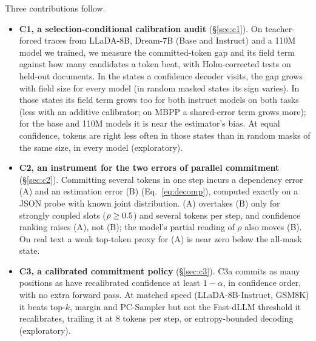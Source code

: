 Three contributions follow.
\begin{itemize}
\item \textbf{C1, a selection-conditional calibration audit} (\S\ref{sec:c1}). On teacher-forced
  traces from LLaDA-8B, Dream-7B (Base and Instruct) and a 110M model we trained, we measure
  the committed-token gap and its field term against how many candidates a token beat, with
  Holm-corrected tests on held-out documents.
  In the states a confidence decoder visits, the gap grows with field size for every model (in
  random masked states its sign varies). In those states its field term grows too for both instruct models on
  both tasks (less with an additive calibrator; on MBPP a shared-error term grows more); for the
  base and 110M models it is near the estimator's bias.
  At equal confidence, tokens are right less often in those states than in random masks of the
  same size, in every model (exploratory).
\item \textbf{C2, an instrument for the two errors of parallel commitment}
  (\S\ref{sec:c2}). Committing several tokens in one step incurs a dependency error (A) and an
  estimation error (B) (Eq.~\ref{eq:decomp}), computed exactly on a JSON probe with known joint
  distribution. (A) overtakes (B) only for strongly coupled slots
  ($\rho\ge0.5$) and several tokens per step, and confidence ranking raises (A),
  not (B); the model's partial reading of $\rho$ also moves (B). On real text a weak top-token proxy for (A) is near zero
  below the all-mask state.
\item \textbf{C3, a calibrated commitment policy} (\S\ref{sec:c3}). C3a commits as many
  positions as have recalibrated confidence at least $1-\alpha$, in
  confidence order, with no extra forward pass. At matched speed
  (LLaDA-8B-Instruct, GSM8K) it beats top-$k$, margin and PC-Sampler but not the Fast-dLLM
  threshold it recalibrates, trailing it at 8 tokens per step, or entropy-bounded decoding
  (exploratory).
\end{itemize}

